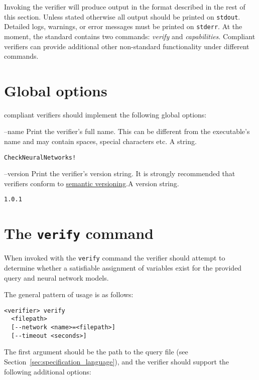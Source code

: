Invoking the verifier will produce output in the format described in the rest of this section. Unless stated otherwise all output should be printed on \texttt{stdout}. Detailed logs, warnings, or error messages must be printed on \texttt{stderr}.
At the moment, the \vnnlib{} standard contains two commands: \emph{verify} and \emph{capabilities}. Compliant verifiers can provide additional other non-standard functionality under different commands. 

\section{Global options}

\vnnlib{} compliant verifiers should implement the following global options:

\clOutputOption
{--name}
{Print the verifier's full name. This can be different from the executable's name and may contain spaces, special characters etc.}
{A string.}
\begin{lstlisting}[style=bash]
%*\exampleVerifier* --name
CheckNeuralNetworks!
\end{lstlisting}

\clOutputOption
{--version}
{Print the verifier's version string. It is strongly recommended that verifiers conform to \href{https://semver.org/}{semantic versioning}.}{A version string.}
\begin{lstlisting}[style=bash]
%*\exampleVerifier* --version
1.0.1
\end{lstlisting}


\section{The \texttt{verify} command}
\label{sec:verify_command}

When invoked with the \texttt{verify} command  the verifier should attempt to determine whether a satisfiable assignment of variables exist for the provided \vnnlib{} query and neural network models.

The general pattern of usage is as follows:
\begin{lstlisting}[style=bash]
<verifier> verify 
  <filepath>
  [--network <name>=<filepath>]
  [--timeout <seconds>]
\end{lstlisting}
The first argument should be the path to the \vnnlib{} query file (see Section~\ref{sec:specification_language}), and the verifier should support the following additional options:


